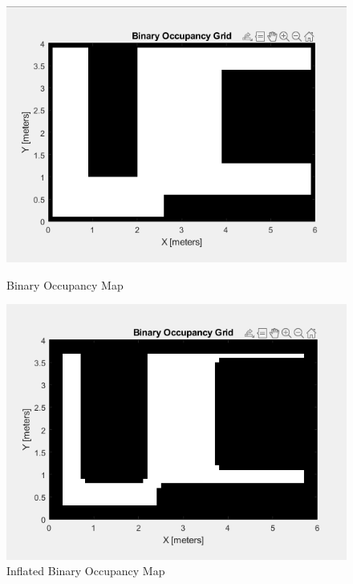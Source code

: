 \documentclass[12pt,a4paper]{article}
\begin{document}
	\begin{figure}[!h]
		\begin{minipage}{0.5\textwidth}
			\includegraphics[width=\textwidth]{Binary Occupancy Map}
			\caption{Binary Occupancy Map}
			\label{fig:1}
		\end{minipage}%
		\begin{minipage}{0.5\textwidth}
			\includegraphics[width=\textwidth]{Inflated Binary Occupancy Map}
			\caption{Inflated Binary Occupancy Map}
			\label{fig:2}
		\end{minipage}
		
		\vspace{5mm} %
		

\end{figure}
\end{document}
